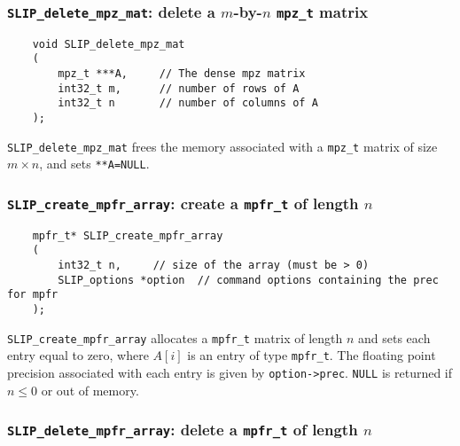 \documentclass[12pt]{article}
\theoremstyle{definition}
\begin{document}
\cprotect\subsubsection{\verb|SLIP_delete_mpz_mat|: delete a $m$-by-$n$ \verb|mpz_t| matrix}

\begin{mdframed}[userdefinedwidth=6in]
{\footnotesize
\begin{verbatim}
    void SLIP_delete_mpz_mat
    (
        mpz_t ***A,     // The dense mpz matrix
        int32_t m,      // number of rows of A
        int32_t n       // number of columns of A
    );
\end{verbatim}
} \end{mdframed}

\verb|SLIP_delete_mpz_mat| frees the memory associated with a \verb|mpz_t|
matrix of size $m \times n$, and sets \verb|**A=NULL|.

\cprotect\subsubsection{\verb|SLIP_create_mpfr_array|: create a \verb|mpfr_t| of length $n$}

\begin{mdframed}[userdefinedwidth=6in]
{\footnotesize
\begin{verbatim}
    mpfr_t* SLIP_create_mpfr_array
    (
        int32_t n,     // size of the array (must be > 0)
        SLIP_options *option  // command options containing the prec for mpfr
    );
\end{verbatim}
} \end{mdframed}

\verb|SLIP_create_mpfr_array| allocates a \verb|mpfr_t| matrix of length $n$
and sets each entry equal to zero, where  $A[i]$ is an entry of type
\verb|mpfr_t|. The floating point precision associated with each entry is given
by \verb|option->prec|. \verb|NULL| is returned if
$n\le 0$ or out of memory.


\cprotect\subsubsection{\verb|SLIP_delete_mpfr_array|: delete a \verb|mpfr_t| of length $n$}
\end{document}
